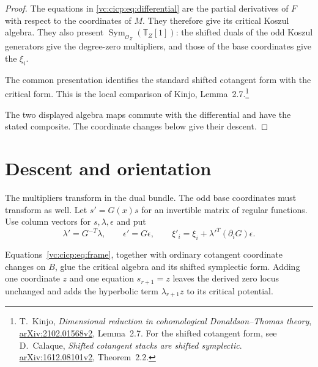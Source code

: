 \begin{proof}
The equations in \eqref{vc:cicp:eq:differential} are the partial
derivatives of $F$ with respect to the coordinates of $M$.
They therefore give its critical Koszul algebra.
They also present
$\operatorname{Sym}_{\mathcal O_Z}(\mathbb T_Z[1])$:
the shifted duals of the odd Koszul generators give the
degree-zero multipliers, and those of the base coordinates
give the $\xi_i$.

The common presentation identifies the standard shifted
cotangent form with the critical form. This is the local
comparison of Kinjo, Lemma~2.7.\footnote{T.~Kinjo,
\emph{Dimensional reduction in cohomological Donaldson--Thomas
theory}, \href{https://arxiv.org/abs/2102.01568v2}{arXiv:2102.01568v2},
Lemma~2.7. For the shifted cotangent form, see
D.~Calaque, \emph{Shifted cotangent stacks are shifted symplectic}.
\href{https://arxiv.org/abs/1612.08101v2}{arXiv:1612.08101v2},
Theorem~2.2.}

The two displayed algebra maps commute with the differential
and have the stated composite. The coordinate changes below
give their descent.
\end{proof}

\section{Descent and orientation}

The multipliers transform in the dual bundle. The odd base
coordinates must transform as well. Let $s'=G(x)s$ for an
invertible matrix of regular functions. Use column vectors for
$s,\lambda,\epsilon$ and put
\begin{equation}\label{vc:cicp:eq:frame}
 \lambda'=G^{-T}\lambda,\qquad \epsilon'=G\epsilon,
 \qquad
 \xi'_i=\xi_i+\lambda'^T(\partial_iG)\epsilon.
\end{equation}

\begin{proposition}\label{vc:cicp:prop:descent}
Equations~\eqref{vc:cicp:eq:frame}, together with ordinary cotangent
coordinate changes on $B$, glue the critical algebra and its
shifted symplectic form. Adding one coordinate $z$ and one
equation $s_{r+1}=z$ leaves the derived zero locus unchanged
and adds the hyperbolic term $\lambda_{r+1}z$ to its critical
potential.
\end{proposition}

